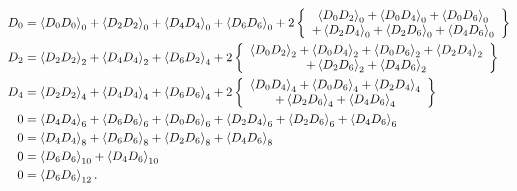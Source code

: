 \documentclass[aps,preprint]{revtex4}%
\begin{document}
\begin{align}
D_{0}  &  =\left\langle D_{0}D_{0}\right\rangle _{0}+\left\langle D_{2}%
D_{2}\right\rangle _{0}+\left\langle D_{4}D_{4}\right\rangle _{0}+\left\langle
D_{6}D_{6}\right\rangle _{0}+2\left\{
\begin{array}
[c]{c}%
\left\langle D_{0}D_{2}\right\rangle _{0}+\left\langle D_{0}D_{4}\right\rangle
_{0}+\left\langle D_{0}D_{6}\right\rangle _{0}\\
+\left\langle D_{2}D_{4}\right\rangle _{0}+\left\langle D_{2}D_{6}%
\right\rangle _{0}+\left\langle D_{4}D_{6}\right\rangle _{0}%
\end{array}
\right\} \nonumber\\
D_{2}  &  =\left\langle D_{2}D_{2}\right\rangle _{2}+\left\langle D_{4}%
D_{4}\right\rangle _{2}+\left\langle D_{6}D_{2}\right\rangle _{4}+2\left\{
\begin{array}
[c]{c}%
\left\langle D_{0}D_{2}\right\rangle _{2}+\left\langle D_{0}D_{4}\right\rangle
_{2}+\left\langle D_{0}D_{6}\right\rangle _{2}+\left\langle D_{2}%
D_{4}\right\rangle _{2}\\
+\left\langle D_{2}D_{6}\right\rangle _{2}+\left\langle D_{4}D_{6}%
\right\rangle _{2}%
\end{array}
\right\} \nonumber\\
D_{4}  &  =\left\langle D_{2}D_{2}\right\rangle _{4}+\left\langle D_{4}%
D_{4}\right\rangle _{4}+\left\langle D_{6}D_{6}\right\rangle _{4}+2\left\{
\begin{array}
[c]{c}%
\left\langle D_{0}D_{4}\right\rangle _{4}+\left\langle D_{0}D_{6}\right\rangle
_{4}+\left\langle D_{2}D_{4}\right\rangle _{4}\\
+\left\langle D_{2}D_{6}\right\rangle _{4}+\left\langle D_{4}D_{6}%
\right\rangle _{4}%
\end{array}
\right\} \nonumber\\
0  &  =\left\langle D_{4}D_{4}\right\rangle _{6}+\left\langle D_{6}%
D_{6}\right\rangle _{6}+\left\langle D_{0}D_{6}\right\rangle _{6}+\left\langle
D_{2}D_{4}\right\rangle _{6}+\left\langle D_{2}D_{6}\right\rangle
_{6}+\left\langle D_{4}D_{6}\right\rangle _{6}\nonumber\\
0  &  =\left\langle D_{4}D_{4}\right\rangle _{8}+\left\langle D_{6}%
D_{6}\right\rangle _{8}+\left\langle D_{2}D_{6}\right\rangle _{8}+\left\langle
D_{4}D_{6}\right\rangle _{8}\nonumber\\
0  &  =\left\langle D_{6}D_{6}\right\rangle _{10}+\left\langle D_{4}%
D_{6}\right\rangle _{10}\nonumber\\
0  &  =\left\langle D_{6}D_{6}\right\rangle _{12}.
\end{align}
\end{document}

